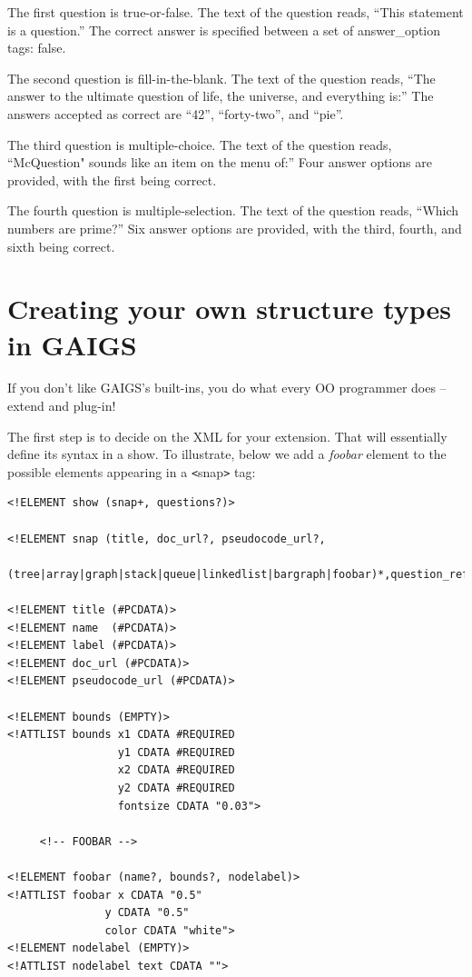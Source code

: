 \documentclass[12pt]{article}
\begin{document}
The first question is true-or-false. The text of the question reads,
``This statement is a question.'' The correct answer is specified
between a set of answer\_option tags: false. 

The second question is fill-in-the-blank. The text of the question
reads, ``The answer to the ultimate question of life, the universe,
and everything is:'' The answers accepted as correct are ``42'',
``forty-two'', and ``pie''.

The third question is multiple-choice. The text of the question reads,
``McQuestion" sounds like an item on the menu of:'' Four answer
options are provided, with the first being correct.

The fourth question is multiple-selection. The text of the question
reads, ``Which numbers are prime?'' Six answer options are provided,
with the third, fourth, and sixth being correct.


\section{Creating your own structure types in GAIGS}
\label{extending-gaigs}

If you don't like GAIGS's built-ins, you do what every OO programmer
does -- extend and plug-in!

The first step is to decide on the XML for your extension.  That will
essentially define its syntax in a show.  To illustrate, below we add
a \textit{foobar} element to the possible elements appearing in a
\verb'<'snap\verb'>' tag:

\footnotesize \begin{verbatim}
<!ELEMENT show (snap+, questions?)>

<!ELEMENT snap (title, doc_url?, pseudocode_url?, 
         (tree|array|graph|stack|queue|linkedlist|bargraph|foobar)*,question_ref?)>

<!ELEMENT title (#PCDATA)>
<!ELEMENT name  (#PCDATA)>
<!ELEMENT label (#PCDATA)>
<!ELEMENT doc_url (#PCDATA)>
<!ELEMENT pseudocode_url (#PCDATA)>

<!ELEMENT bounds (EMPTY)>
<!ATTLIST bounds x1 CDATA #REQUIRED
                 y1 CDATA #REQUIRED
                 x2 CDATA #REQUIRED
                 y2 CDATA #REQUIRED
                 fontsize CDATA "0.03">

     <!-- FOOBAR -->

<!ELEMENT foobar (name?, bounds?, nodelabel)>
<!ATTLIST foobar x CDATA "0.5"
               y CDATA "0.5"
               color CDATA "white">
<!ELEMENT nodelabel (EMPTY)>
<!ATTLIST nodelabel text CDATA "">
\end{verbatim} \normalsize
\end{document}

